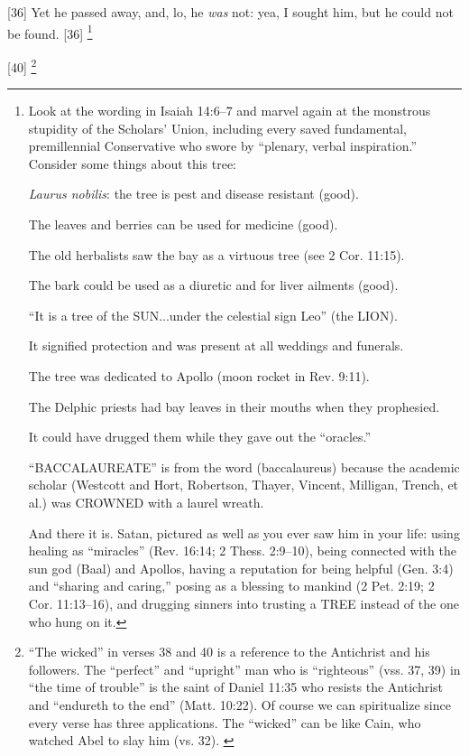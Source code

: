 [36] \textcolor[rgb]{0.00,0.00,1.00}{Yet he passed away, and, lo, he \emph{was} not: yea, I sought him, but he could not be found.}
[36] \footnote{Look at the wording in Isaiah 14:6–7 and marvel again at the monstrous stupidity of the Scholars’ Union, including every saved fundamental, premillennial Conservative who swore by “plenary, verbal inspiration.” \cite{Ruckman1992Psalms} Consider some things about this tree:\begin{compactenum}
\item \emph{Laurus nobilis}: the tree is pest and disease resistant (good).
\item The leaves and berries can be used for medicine (good).
\item The old herbalists saw the bay as a virtuous tree (see 2 Cor. 11:15).
\item The bark could be used as a diuretic and for liver ailments (good).
\item “It is a tree of the SUN...under the celestial sign Leo” (the LION).
\item It signified protection and was present at all weddings and funerals.
\item The tree was dedicated to Apollo (moon rocket in Rev. 9:11).
\item The Delphic priests had bay leaves in their mouths when they prophesied.
\item It could have drugged them while they gave out the “oracles.”
\item “BACCALAUREATE” is from the word (baccalaureus) because the academic scholar (Westcott and Hort, Robertson, Thayer, Vincent, Milligan, Trench, et al.) was CROWNED with a laurel wreath.
\end{compactenum} And there it is. Satan, pictured as well as you ever saw him in your life: using healing as “miracles” (Rev. 16:14; 2 Thess. 2:9–10), being connected with the sun god (Baal) and Apollos, having a reputation for being helpful (Gen. 3:4) and “sharing and caring,” posing as a blessing to mankind (2 Pet. 2:19; 2 Cor. 11:13–16), and drugging sinners into trusting a TREE instead of the one who hung on it.}

[40] \footnote{“The wicked” in verses 38 and 40 is a reference to the Antichrist and his followers. The “perfect” and “upright” man who is “righteous” (vss. 37, 39) in “the time of trouble” is the saint of Daniel 11:35 who resists the Antichrist and “endureth to the end” (Matt. 10:22). Of course we can spiritualize since every verse has three applications. The “wicked” can be like Cain, who watched Abel to slay him (vs. 32). \cite{Ruckman1992Psalms}}

